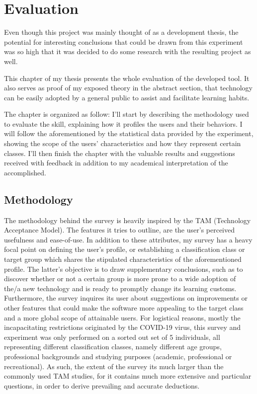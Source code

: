 \chapter{Evaluation}
\label{cha:evaluation}

Even though this project was mainly thought of as a development thesis,
the potential for interesting conclusions that 
could be drawn from this experiment was so high that it was decided 
to do some research with the resulting project as well.

This chapter of my thesis presents the whole evaluation of the 
developed tool. It also serves as proof of my exposed theory in 
the abstract section, that technology can be easily adopted by 
a general public to assist and facilitate learning habits.

The chapter is organized as follow: I'll start by describing 
the methodology used to evaluate the skill, explaining how 
it profiles the users and their behaviors. I will follow 
the aforementioned by the statistical data provided 
by the experiment, showing the scope of the users' 
characteristics and how they represent certain classes. 
I'll then finish the chapter with the valuable results 
and suggestions received with feedback in addition to 
my academical interpretation of the accomplished.


\section{Methodology}

The methodology behind the survey is heavily inspired by the TAM 
(Technology Acceptance Model). The features it tries to outline, 
are the user's perceived usefulness and ease-of-use. 
In addition to these attributes, my survey has a heavy focal 
point on defining the user's profile, or establishing a 
classification class or target group which shares the stipulated 
characteristics of the aforementioned profile. The latter's 
objective is to draw supplementary conclusions, such as to 
discover whether or not a certain group is more prone to a 
wide adoption of the/a new technology and is ready to promptly 
change its learning customs.
Furthermore, the survey inquires its user about suggestions 
on improvements or other features that could make the 
software more appealing to the target class and a more 
global scope of attainable users.
For logistical reasons, mostly the incapacitating restrictions 
originated by the COVID-19 virus, 
this survey and experiment was only performed on 
a sorted out set of 5 individuals, 
all representing different classification classes, namely different 
age groups, professional backgrounds and studying purposes 
(academic, professional or recreational).
As such, the extent of the survey its 
much larger than the commonly used TAM studies, 
for it contains much more extensive and 
particular questions, in order to derive prevailing 
and accurate deductions.



